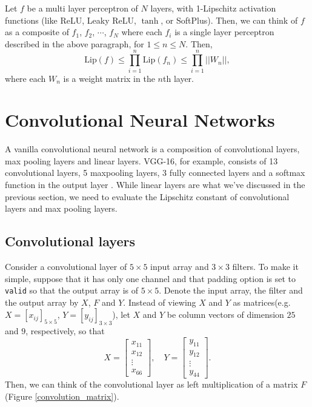 \documentclass[12pt]{report}
\numberwithin{figure}{chapter}
\theoremstyle{plain}
\theoremstyle{definition}
\theoremstyle{corollary}
\theoremstyle{definition}
\theoremstyle{plain}
\theoremstyle{definition}
\theoremstyle{plain}
\newcommand\lip{\ensuremath{\text{Lip}}}
\begin{document}
Let \(f\) be a multi layer perceptron of \(N\) layers, with 1-Lipschitz activation functions (like ReLU, Leaky ReLU, \(\tanh\), or SoftPlus).
Then, we can think of \(f\) as a composite of \(f_1\), \(f_2\), \(\cdots\), \(f_N\) where each \(f_i\) is a single layer perceptron described in the above paragraph, for \(1\le n\le N\).
Then,
\[\lip(f)\le\prod_{i=1}^n\lip(f_n)\le\prod_{i=1}^n||W_n||,\]
where each \(W_n\) is a weight matrix in the \(n\)th layer.

\section{Convolutional Neural Networks}

A vanilla convolutional neural network is a composition of convolutional layers, max pooling layers and linear layers.
VGG-16, for example, consists of 13 convolutional layers, 5 maxpooling layers, 3 fully connected layers and a softmax function in the output layer \cite{SK-ZA}.
While linear layers are what we've discussed in the previous section, we need to evaluate the Lipschitz constant of convolutional layers and max pooling layers.

\subsection{Convolutional layers}\label{convolutional_layers}
Consider a convolutional layer of \(5\times 5\) input array and \(3\times 3\) filters.
To make it simple, suppose that it has only one channel and that padding option is set to \texttt{valid} so that the output array is of \(5\times 5\).
Denote the input array, the filter and the output array by \(X\), \(F\) and \(Y\).
Instead of viewing \(X\) and \(Y\) as matrices(e.g. \(X=[x_{ij}]_{5\times 5}\), \(Y=[y_{ij}]_{3\times 3}\)), let \(X\) and \(Y\) be column vectors of dimension \(25\) and \(9\), respectively, so that
\[X=\begin{bmatrix}x_{11}\\x_{12}\\\vdots\\x_{66}\end{bmatrix},\quad
Y=\begin{bmatrix}y_{11}\\y_{12}\\\vdots\\y_{44}\end{bmatrix}.\]
Then, we can think of the convolutional layer as left multiplication of a matrix \(F\) (Figure \ref{convolution_matrix}).
\end{document}
